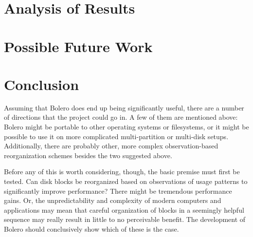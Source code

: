 \documentclass[10pt,twocolumn]{article}
\begin{document}
\section{Analysis of Results}

\section{Possible Future Work}

\section{Conclusion}

Assuming that Bolero does end up being significantly useful, there are a number of directions that
the project could go in. A few of them are mentioned above: Bolero might be portable to other
operating systems or filesystems, or it might be possible to use it on more complicated multi-partition
or multi-disk setups. Additionally, there are probably other, more complex observation-based reorganization schemes
besides the two suggested above.

Before any of this is worth considering, though, the basic premise must first be tested. Can disk
blocks be reorganized based on observations of usage patterns to significantly improve performance?
There might be tremendous performance gains. Or, the unpredictability and complexity of modern
computers and applications may mean that careful organization of blocks in a seemingly helpful
sequence may really result in little to no perceivable benefit. The development of Bolero should conclusively
show which of these is the case.

{}

\end{document}
